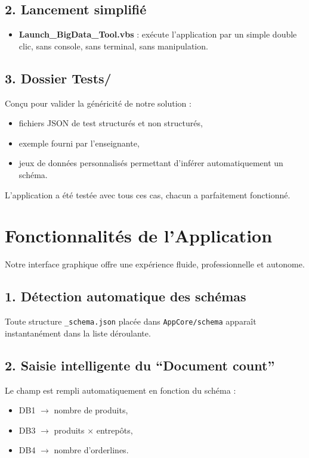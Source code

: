 \documentclass[12pt,a4paper]{article}
\begin{document}
\subsection*{2. Lancement simplifié}

\begin{itemize}
    \item \textbf{Launch\_BigData\_Tool.vbs} : exécute l’application par un simple double   clic,
          sans console, sans terminal, sans manipulation.
\end{itemize}

\subsection*{3. Dossier Tests/}

Conçu pour valider la généricité de notre solution :

\begin{itemize}
    \item fichiers JSON de test structurés et non structurés,
    \item exemple fourni par l’enseignante,
    \item jeux de données personnalisés permettant d'inférer automatiquement un schéma.
\end{itemize}

L’application a été testée avec tous ces cas, chacun a parfaitement fonctionné.

\section{Fonctionnalités de l’Application}

Notre interface graphique offre une expérience fluide, professionnelle et autonome.

\subsection{1. Détection automatique des schémas}

Toute structure \texttt{\_schema.json} placée dans \texttt{AppCore/schema} apparaît instantanément dans la liste déroulante.

\subsection{2. Saisie intelligente du ``Document count''}

Le champ est rempli automatiquement en fonction du schéma :
\begin{itemize}
    \item DB1 \(\rightarrow\) nombre de produits,
    \item DB3 \(\rightarrow\) produits × entrepôts,
    \item DB4 \(\rightarrow\) nombre d’orderlines.
\end{itemize}
\end{document}
